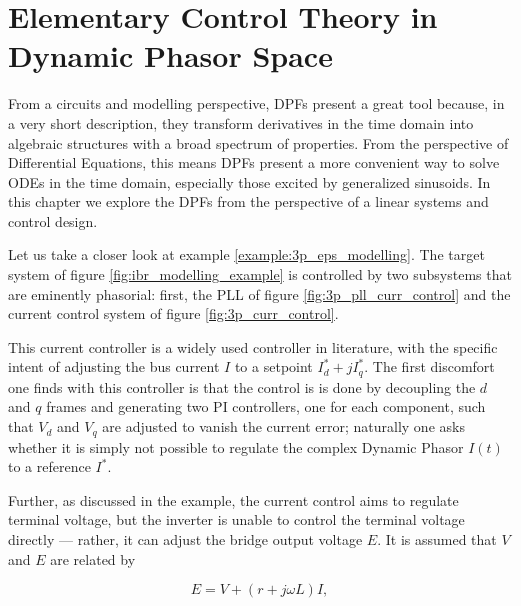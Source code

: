 \chapter{Elementary Control Theory in Dynamic Phasor Space}\label{chapter:control_theory}

	From a circuits and modelling perspective, DPFs present a great tool because, in a very short description, they transform derivatives in the time domain into algebraic structures with a broad spectrum of properties. From the perspective of Differential Equations, this means DPFs present a more convenient way to solve ODEs in the time domain, especially those excited by generalized sinusoids. In this chapter we explore the DPFs from the perspective of a linear systems and control design.

	Let us take a closer look at example \ref{example:3p_eps_modelling}. The target system of figure \ref{fig:ibr_modelling_example} is controlled by two subsystems that are eminently phasorial: first, the PLL of figure \ref{fig:3p_pll_curr_control} and the current control system of figure \ref{fig:3p_curr_control}. 

	This current controller is a widely used controller in literature, with the specific intent of adjusting the bus current $I$ to a setpoint $I_d^* + jI_q^*$. The first discomfort one finds with this controller is that the control is is done by decoupling the $d$ and $q$ frames and generating two PI controllers, one for each component, such that $V_d$ and $V_q$ are adjusted to vanish the current error; naturally one asks whether it is simply not possible to regulate the complex Dynamic Phasor $I(t)$ to a reference $I^*$.

	Further, as discussed in the example, the current control aims to regulate terminal voltage, but the inverter is unable to control the terminal voltage directly — rather, it can adjust the bridge output voltage $E$. It is assumed that $V$ and $E$ are related by 

\begin{equation} E = V + \left(r + j\omega L\right)I ,\label{eq:pi_adjust_e}\end{equation}

